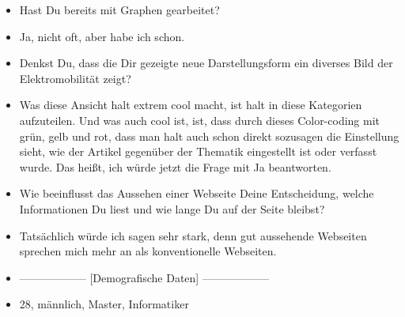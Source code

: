 {\begin{itemize}[]
        Ja, und wenn die Knoten, die noch keine Betitelung hatten, wenn die sozusagen auch noch eine Betitelung bekommen würden, dann wäre die Navigation durch diesen ganzen Graphen noch intuitiver und einfacher.
        \item {} Hast Du bereits mit Graphen gearbeitet?
        \item {} Ja, nicht oft, aber habe ich schon.
        \item {} Denkst Du, dass die Dir gezeigte neue Darstellungsform ein diverses Bild der Elektromobilität zeigt?
        \item {} Was diese Ansicht halt extrem cool macht, ist halt in diese Kategorien aufzuteilen.
        Und was auch cool ist, ist, dass durch dieses Color-coding mit grün, gelb und rot, dass man halt auch schon direkt sozusagen die Einstellung sieht, wie der Artikel gegenüber der Thematik eingestellt ist oder verfasst wurde. 
        Das heißt, ich würde jetzt die Frage mit Ja beantworten.
        \item {} Wie beeinflusst das Aussehen einer Webseite Deine Entscheidung, welche Informationen Du liest und wie lange Du auf der Seite bleibst?
        \item {} Tatsächlich würde ich sagen sehr stark, denn gut aussehende Webseiten sprechen mich mehr an als konventionelle Webseiten.
        \item {------------------} [Demografische Daten] {------------------}
        \item {} 28, männlich, Master, Informatiker
    \end{itemize}}
\nolinenumbers

